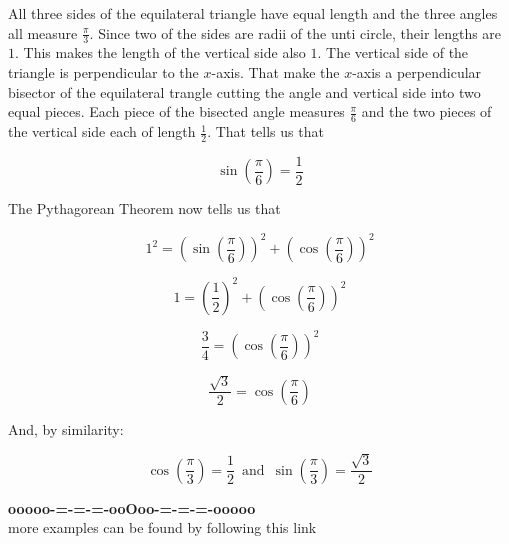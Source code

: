 \documentclass{ximera}
\begin{document}
All three sides of the equilateral triangle have equal length and the three angles all measure $\frac{\pi}{3}$.  Since two of the sides are radii of the unti circle, their lengths are $1$.  This makes the length  of the vertical side also $1$.  The vertical side of the triangle is perpendicular to the $x$-axis.  That make the $x$-axis a perpendicular bisector of the equilateral trangle cutting the angle and vertical side into two equal pieces. Each piece of the bisected angle measures $\frac{\pi}{6}$ and the two pieces of the vertical side each of length $\frac{1}{2}$. That tells us that 

\[  \sin\left( \frac{\pi}{6} \right) = \frac{1}{2} \]


The Pythagorean Theorem now tells us that 

\[  1^2 = \left( \sin\left( \frac{\pi}{6} \right) \right)^2 + \left( \cos\left( \frac{\pi}{6} \right) \right)^2  \]


\[  1 = \left( \frac{1}{2} \right)^2 + \left( \cos\left( \frac{\pi}{6} \right) \right)^2  \]


\[  \frac{3}{4} = \left( \cos\left( \frac{\pi}{6} \right) \right)^2  \]



\[  \frac{\sqrt{3}}{2} = \cos\left( \frac{\pi}{6} \right)   \]



And, by similarity:


\[  \cos\left( \frac{\pi}{3} \right) = \frac{1}{2}   \, \text{ and } \,   \sin\left( \frac{\pi}{3} \right)  = \frac{\sqrt{3}}{2} \]  












\begin{center}
\textbf{\textcolor{green!50!black}{ooooo-=-=-=-ooOoo-=-=-=-ooooo}} \\

more examples can be found by following this link\\ 

\end{center}
\end{document}

